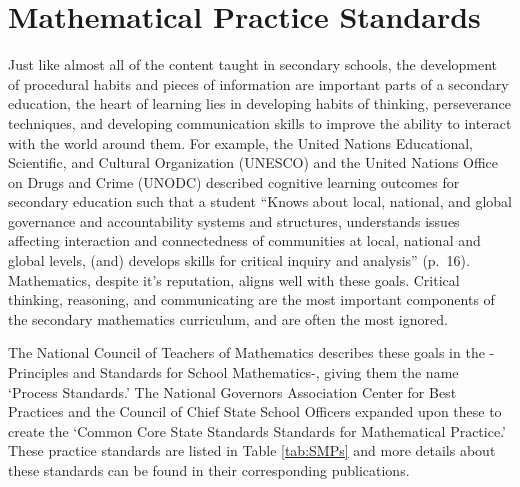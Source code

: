 \documentclass[
]{book}
\theoremstyle{definition}
\theoremstyle{definition}
\theoremstyle{definition}
\theoremstyle{remark}
\begin{document}
\hypertarget{mathematical-practice-standards}{%
\section{Mathematical Practice Standards}\label{mathematical-practice-standards}}

Just like almost all of the content taught in secondary schools, the development of procedural habits and pieces of information are important parts of a secondary education, the heart of learning lies in developing habits of thinking, perseverance techniques, and developing communication skills to improve the ability to interact with the world around them. For example, the United Nations Educational, Scientific, and Cultural Organization (UNESCO) and the United Nations Office on Drugs and Crime (UNODC) \citeyearpar{UNESCO} described cognitive learning outcomes for secondary education such that a student ``Knows about local, national, and global governance and accountability systems and structures, understands issues affecting interaction and connectedness of communities at local, national and global levels, (and) develops skills for critical inquiry and analysis'' (p.~16). Mathematics, despite it's reputation, aligns well with these goals. Critical thinking, reasoning, and communicating are the most important components of the secondary mathematics curriculum, and are often the most ignored.

The National Council of Teachers of Mathematics \citeyearpar{PSSM} describes these goals in the -Principles and Standards for School Mathematics-, giving them the name `Process Standards.' The National Governors Association Center for Best Practices and the Council of Chief State School Officers \citep{CCSS} expanded upon these to create the `Common Core State Standards Standards for Mathematical Practice.' These practice standards are listed in Table \ref{tab:SMPs} and more details about these standards can be found in their corresponding publications.
\end{document}
